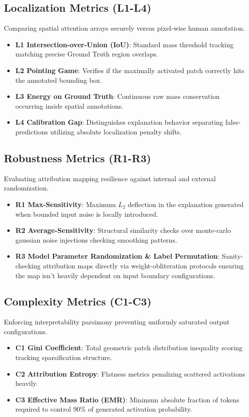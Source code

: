 \documentclass[10pt,journal,compsoc]{IEEEtran}
\begin{document}
\subsection{Localization Metrics (L1-L4)}
Comparing spatial attention arrays securely versus pixel-wise human annotation.
\begin{itemize}
    \item \textbf{L1 Intersection-over-Union (IoU)}: Standard mass threshold tracking matching precise Ground Truth region overlaps.
    \item \textbf{L2 Pointing Game}: Verifies if the maximally activated patch correctly hits the annotated bounding box.
    \item \textbf{L3 Energy on Ground Truth}: Continuous raw mass conservation occurring inside spatial annotations.
    \item \textbf{L4 Calibration Gap}: Distinguishes explanation behavior separating false-predictions utilizing absolute localization penalty shifts.
\end{itemize}

\subsection{Robustness Metrics (R1-R3)}
Evaluating attribution mapping resilience against internal and external randomization.
\begin{itemize}
    \item \textbf{R1 Max-Sensitivity}: Maximum $L_{2}$ deflection in the explanation generated when bounded input noise is locally introduced.
    \item \textbf{R2 Average-Sensitivity}: Structural similarity checks over monte-carlo gaussian noise injections checking smoothing patterns.
    \item \textbf{R3 Model Parameter Randomization \& Label Permutation}: Sanity-checking attribution maps directly via weight-obliteration protocols ensuring the map isn't heavily dependent on input boundary configurations.
\end{itemize}

\subsection{Complexity Metrics (C1-C3)}
Enforcing interpretability parsimony preventing uniformly saturated output configurations.
\begin{itemize}
    \item \textbf{C1 Gini Coefficient}: Total geometric patch distribution inequality scoring tracking sparsification structure.
    \item \textbf{C2 Attribution Entropy}: Flatness metrics penalizing scattered activations heavily.
    \item \textbf{C3 Effective Mass Ratio (EMR)}: Minimum absolute fraction of tokens required to control 90\% of generated activation probability.
\end{itemize}
\end{document}
